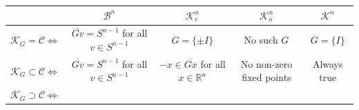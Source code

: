 \documentclass[12pt, reqno]{amsart}
\theoremstyle{definition}
\theoremstyle{remark}
\numberwithin{equation}{section}
\newcommand{\Rn}{\mathbb{R}^{n}}
\newcommand{\Sn}{S^{n-1}}
\begin{document}
	   
	   \begin{table}[h]
	   	\centering
	   	\begin{tabular}{|c|c|c|c|c|}
	   		\hline
	   		 \diagbox[width=5.5em, height=1.8em]{}{$\mathcal{C}$} & $\mathcal{B}^n$ & $\mathcal{K}_e^n$ & $\mathcal{K}_o^n$ & $\mathcal{K}^n$ \\ 
	   		\hline
	   		$\mathcal{K}_{G} = \mathcal{C}  \iff$ & 
	   		\begin{minipage}{0.18\textwidth}
	   			\vspace{0.2em}
	   			$\overline{Gv}=\Sn$ for all  $v\in S^{n-1}$
	   			\vspace{0.2em}
	   		\end{minipage} & 
	   		\begin{minipage}{0.18\textwidth}
	   			$G = \{\pm I\}$
	   		\end{minipage} & 
	   		\begin{minipage}{0.18\textwidth}
	   			No such $G$
	   		\end{minipage} &
	   		\begin{minipage}{0.18\textwidth}
	   			$G=\{I\}$
	   		\end{minipage} \\ 
	   		\hline
	   		$\mathcal{K}_{G} \subset \mathcal{C} \iff$ & 
	   		\begin{minipage}{0.18\textwidth}
	   			\vspace{0.2em}
	   				$\overline{Gv}=\Sn$ for all  $v\in S^{n-1}$
	   				\vspace{0.2em}
	   		\end{minipage} & 
	   		\begin{minipage}{0.18\textwidth}
	   			\vspace{0.2em}
	   			$-x \in \overline{Gx}$ for all $x\in \Rn$
	   			\vspace{0.2em}
	   		\end{minipage} & 
	   		\begin{minipage}{0.18\textwidth}
	   			\vspace{0.2em}
	   			No non-zero fixed points
	   			\vspace{0.2em}
	   		\end{minipage} &
	   		\begin{minipage}{0.18\textwidth}
	   			Always true
	   		\end{minipage} \\ 
	   		\hline
	   		$\mathcal{K}_{G} \supset \mathcal{C} \iff$ & 
	   		\begin{minipage}{0.18\textwidth}

\end{minipage}
\end{tabular}
\end{table}
\end{document}
